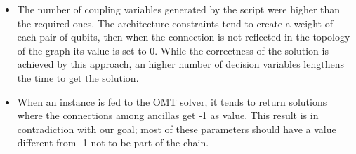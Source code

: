 \begin{itemize}
    \item The number of coupling variables generated by the script were higher than the required ones. The architecture constraints tend to create a weight of each pair of qubits, then when the connection is not reflected in the topology of the graph its value is set to 0. While the correctness of the solution is achieved by this approach, an higher number of decision variables lengthens the time to get the solution.
    \item When an instance is fed to the OMT solver, it tends to return solutions where the connections among ancillas get -1 as value. This result is in contradiction with our goal; most of these parameters should have a value different from -1 not to be part of the chain.
\end{itemize}

\newpage

